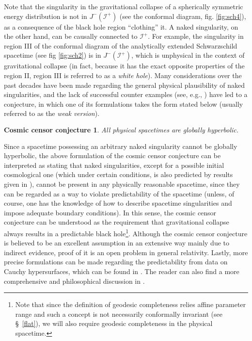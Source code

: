 \documentclass[
12pt,		%
openright,	%
twoside,  %
a4paper,			%
chapter=TITLE,		%
english,			%
french,				%
spanish,			%
brazil				%
]{USPSC-classe/USPSC}
\newtheorem*{cosmic*}{Cosmic censor conjecture}
\begin{document}
Note that the singularity in the gravitational collapse of a spherically symmetric energy distribution is not in $J^-(\mathscr{I^+})$ (see the conformal diagram, fig. \ref{fig:sch4}), as a consequence of the black hole region ``clothing'' it. A naked singularity, on the other hand, can be causally connected to $\mathscr{I^+}$. For example, the singularity in region III of the conformal diagram of the analytically extended Schwarzschild spacetime (see fig \ref{fig:sch2}) is in $J^-(\mathscr{I^+})$, which is unphysical in the context of gravitational collapse (in fact, because it has the exact opposite properties of the region II, region III is referred to as a \textit{white hole}). Many considerations over the past decades have been made regarding the general physical plausibility of naked singularities, and the lack of successful counter examples (see, e.g., \cite{Wald1997a}) have led to a conjecture, in which one of its formulations takes the form stated below (usually referred to as the \textit{weak version}).

\begin{cosmic*}

All physical spacetimes are globally hyperbolic.
 
\end{cosmic*}

Since a spacetime possessing an arbitrary naked singularity cannot be globally hyperbolic, the above formulation of the cosmic censor conjecture can be interpreted as stating that naked singularities, except for a possible initial cosmological one (which under certain conditions, is also predicted by results given in \cite{Hawking1970}), cannot be present in any physically reasonable spacetime, since they can be regarded as a way to violate predictability of the spacetime (unless, of course, one has the knowledge of how to describe spacetime singularities and impose adequate boundary conditions). In this sense, the cosmic censor conjecture can be understood as the requirement that gravitational collapse always results in a predictable black hole\footnote{Note that since the definition of geodesic completeness relies affine parameter range and such a concept is not necessarily conformally invariant (see \S~\ref{flat}), we will also require geodesic completeness in the physical spacetime.}. Although the cosmic censor conjecture is believed to be an excellent assumption in an extensive way mainly due to indirect evidence, proof of it is an open problem in general relativity. Lastly, more precise formulations can be made regarding the predictability from data on Cauchy hypersurfaces, which can be found in \cite{Wald1984}. The reader can also find a more comprehensive and philosophical discussion in \cite{Landsman2021}.
\end{document}
